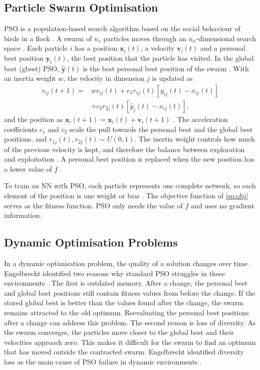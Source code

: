 \documentclass[conference]{IEEEtran}
\begin{document}
\subsection{Particle Swarm Optimisation}
PSO is a population-based search algorithm based on the social
behaviour of birds in a flock \cite{engelbrecht2007}. A swarm of $n_s$ particles moves through an $n_x$-dimensional search
space \cite{engelbrecht2007}. Each particle $i$ has a
position $\mathbf{x}_i(t)$, a velocity $\mathbf{v}_i(t)$ and a
personal best position $\mathbf{y}_i(t)$, the best position that the
particle has visited. In the global best (gbest) PSO, 
$\hat{\mathbf{y}}(t)$ is the best personal best position of the swarm
\cite{engelbrecht2007}. With an inertia weight $w$, the
velocity in dimension $j$ is updated as
\begin{equation}
\begin{split}
v_{ij}(t+1) = {} & w v_{ij}(t) + c_1 r_{1j}(t)[y_{ij}(t) - x_{ij}(t)] \\
& + c_2 r_{2j}(t)[\hat{y}_j(t) - x_{ij}(t)],
\end{split}
\end{equation}
and the position as
$\mathbf{x}_i(t+1) = \mathbf{x}_i(t) + \mathbf{v}_i(t+1)$
\cite{engelbrecht2007}. The acceleration coefficients
$c_1$ and $c_2$ scale the pull towards the personal best and the
global best positions, and $r_{1j}(t), r_{2j}(t) \sim U(0,1)$. The
inertia weight controls how much of the previous velocity is kept,
and therefore the balance between exploration and exploitation
\cite{engelbrecht2007}. A personal best position is replaced
when the new position has a lower value of $f$
\cite{engelbrecht2007}.

To train an NN with PSO, each particle represents one complete
network, so each element of the position is one weight or bias
\cite{engelbrecht2007}. The objective function of
\eqref{eq:obj} serves as the fitness function. PSO only needs the
value of $f$ and uses no gradient information.

\subsection{Dynamic Optimisation Problems}
In a dynamic optimisation problem, the quality of a solution changes over 
time \cite{dennis2021}. Engelbrecht identified two reasons why standard PSO 
struggles in these environments \cite{engelbrecht2007}. The first is outdated 
memory. After a change, the personal best and global best positions still contain 
fitness values from before the change. If the stored global best is better 
than the values found after the change, the swarm remains attracted to the 
old optimum. Reevaluating the personal best positions after a change can 
address this problem. The second reason is loss of diversity. As the swarm converges, the particles 
move closer to the global best and their velocities approach zero. This makes 
it difficult for the swarm to find an optimum that has moved outside the 
contracted swarm. Engelbrecht identified diversity loss as the main cause of 
PSO failure in dynamic environments \cite{engelbrecht2007}.
\end{document}
